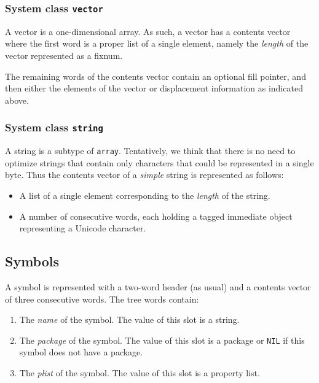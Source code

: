 \subsubsection{System class \texttt{vector}}

A vector is a one-dimensional array.  As such, a vector has a contents
vector where the first word is a proper list of a single element,
namely the \emph{length} of the vector represented as a fixnum. 

The remaining words of the contents vector contain an optional fill
pointer, and then either the elements of the vector or displacement
information as indicated above. 

\subsubsection{System class \texttt{string}}

A string is a subtype of \texttt{array}.  Tentatively, we think that
there is no need to optimize strings that contain only characters that
could be represented in a single byte.  Thus the contents vector of a
\emph{simple} string is represented as follows:

\begin{itemize}
\item A list of a single element corresponding to the \emph{length} of
  the string. 
\item A number of consecutive words, each holding a tagged immediate
  object representing a Unicode character.
\end{itemize}

\subsection{Symbols}

A symbol is represented with a two-word header (as usual) and a
contents vector of three consecutive words.  The tree words contain:

\begin{enumerate}
\item The \emph{name} of the symbol.  The value of this slot is a
  string.
\item The \emph{package} of the symbol.  The value of this slot is a
  package or \texttt{NIL} if this symbol does not have a package.
\item The \emph{plist} of the symbol.  The value of this slot is a
  property list.
\end{enumerate}

